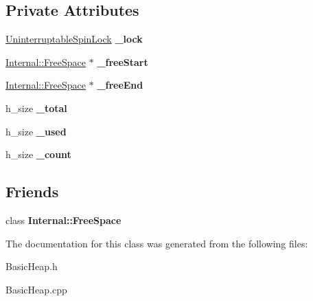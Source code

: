 \subsection*{Private Attributes}
\begin{DoxyCompactItemize}
\item 
\mbox{\label{class_basic_heap_afe5c9a65bbcb44b616b8db3ec422931e}} 
\hyperlink{class_uninterruptable_spin_lock}{Uninterruptable\+Spin\+Lock} {\bfseries \+\_\+lock}
\item 
\mbox{\label{class_basic_heap_a44e524a3f3699e0a323ff2d24a65cdf6}} 
\hyperlink{class_internal_1_1_free_space}{Internal\+::\+Free\+Space} $\ast$ {\bfseries \+\_\+free\+Start}
\item 
\mbox{\label{class_basic_heap_acdc247c3c9a6056b9592ca61860888a5}} 
\hyperlink{class_internal_1_1_free_space}{Internal\+::\+Free\+Space} $\ast$ {\bfseries \+\_\+free\+End}
\item 
\mbox{\label{class_basic_heap_acbd2e99a996b5dc3bf52660545a93be1}} 
h\+\_\+size {\bfseries \+\_\+total}
\item 
\mbox{\label{class_basic_heap_a88ebb1670a21c2dc251995486da321f0}} 
h\+\_\+size {\bfseries \+\_\+used}
\item 
\mbox{\label{class_basic_heap_ae48f81b1c1d3e5d76441a6b3438c55de}} 
h\+\_\+size {\bfseries \+\_\+count}
\end{DoxyCompactItemize}
\subsection*{Friends}
\begin{DoxyCompactItemize}
\item 
\mbox{\label{class_basic_heap_abcdce91148dce0245ab64ecb3763fccd}} 
class {\bfseries Internal\+::\+Free\+Space}
\end{DoxyCompactItemize}


The documentation for this class was generated from the following files\+:\begin{DoxyCompactItemize}
\item 
Basic\+Heap.\+h\item 
Basic\+Heap.\+cpp\end{DoxyCompactItemize}
